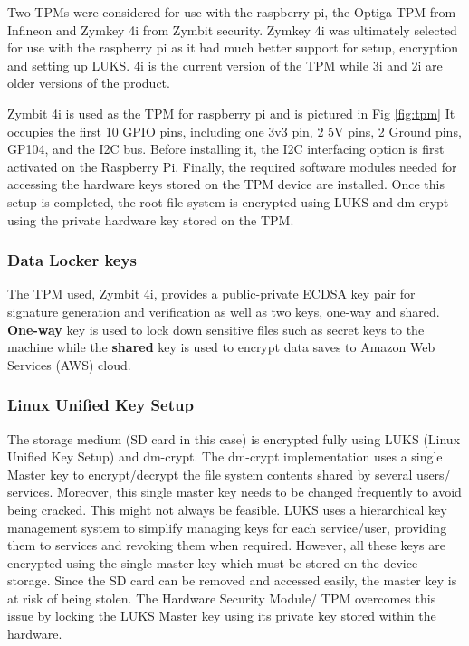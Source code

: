 \documentclass[11pt,openright]{report}
\begin{document}
Two TPMs were considered for use with the raspberry pi, the Optiga TPM from Infineon and Zymkey 4i from Zymbit security. Zymkey 4i was ultimately selected for use with the raspberry pi as it had much better support for setup, encryption and setting up LUKS. 4i is the current version of the TPM while 3i and 2i are older versions of the product.

Zymbit 4i is used as the TPM for raspberry pi and is pictured in Fig \ref{fig:tpm}  It occupies the first 10 GPIO pins, including one 3v3 pin, 2 5V pins, 2 Ground pins, GP104, and the I2C bus. Before installing it, the I2C interfacing option is first activated on the Raspberry Pi. Finally, the required software modules needed for accessing the hardware keys stored on the TPM device are installed. Once this setup is completed, the root file system is encrypted using LUKS and dm-crypt using the private hardware key stored on the TPM.

\subsubsection{Data Locker keys}
The TPM used, Zymbit 4i, provides a public-private ECDSA key pair for signature generation and verification as well as two keys, one-way and shared. \textbf{One-way} key is used to lock down sensitive files such as secret keys to the machine while the \textbf{shared} key is used to encrypt data saves to Amazon Web Services (AWS) cloud. 

\subsubsection{Linux Unified Key Setup}
The storage medium (SD card in this case) is encrypted fully using LUKS \cite{cryptoeprint:2016:274} (Linux Unified Key Setup) and dm-crypt. The dm-crypt implementation uses a single Master key to encrypt/decrypt the file system contents shared by several users/ services. Moreover, this single master key needs to be changed frequently to avoid being cracked. This might not always be feasible. LUKS uses a hierarchical key management system to simplify managing keys for each service/user, providing them to services and revoking them when required. However, all these keys are encrypted using the single master key which must be stored on the device storage. Since the SD card can be removed and accessed easily, the master key is at risk of being stolen. The Hardware Security Module/ TPM overcomes this issue by locking the LUKS Master key using its private key stored within the hardware.
\end{document}
